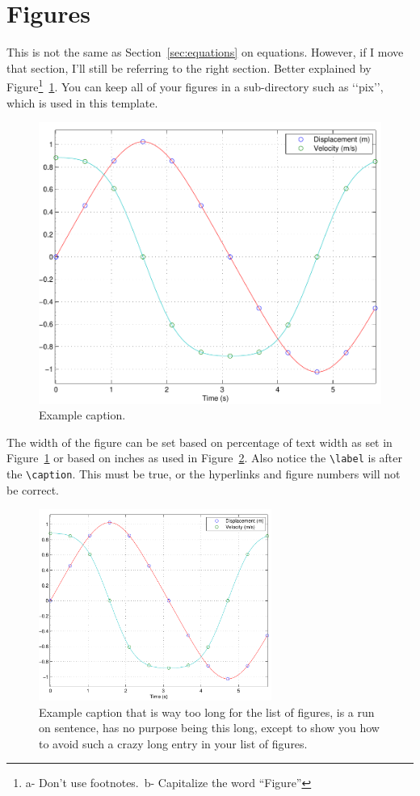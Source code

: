 \documentclass[12pt]{report}
\begin{document}
\section{Figures}
This is not the same as Section~\ref{sec:equations} on equations. However, if I move that section, I'll still be referring to the right section.
Better explained by Figure\footnote{a- Don't use footnotes.\ b- Capitalize the word ``Figure''}~\ref{fig:example}.  You can keep all of your figures in a sub-directory such as \lq\lq{}pix\rq\rq{}, which is used in this template.
\begin{figure}[htbp] %
   \centering
   \includegraphics[width=.5\textwidth]{pix/example} %
   \caption{Example caption.}
\label{fig:example}
\end{figure}

The width of the figure can be set based on percentage of text width as set in Figure~\ref{fig:example} or based on inches as used in Figure~\ref{fig:example2}.  Also notice the \verb'\label' is after the \verb'\caption'.  This must be true, or the hyperlinks and figure numbers will not be correct.

\begin{figure}[!t] %
   \centering
   \includegraphics[width=3in]{pix/example} %
   \caption[Short Figure Caption]{Example caption that is way too long for the list of figures, is a run on sentence, has no purpose being this long, except to show you how to avoid such a crazy long entry in your list of figures.}
\label{fig:example2}
\end{figure}
\end{document}
